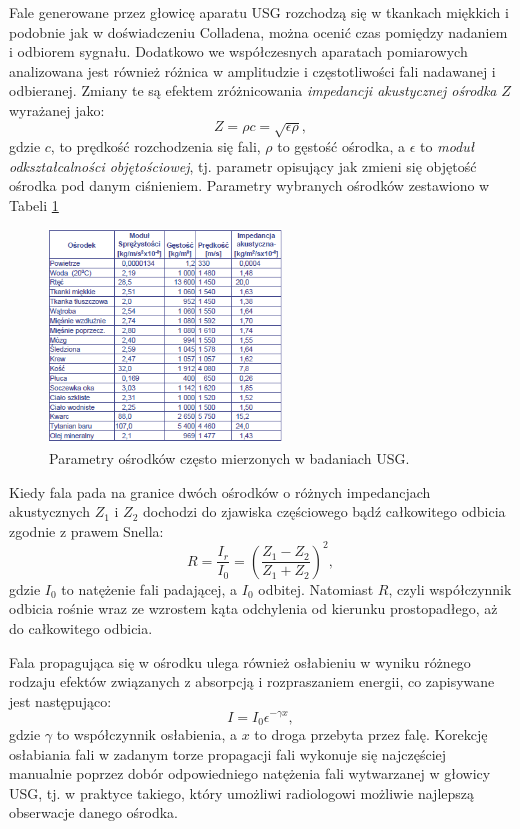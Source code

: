 Fale generowane przez głowicę aparatu USG rozchodzą się w tkankach miękkich i podobnie jak w doświadczeniu Colladena, można ocenić czas pomiędzy nadaniem i odbiorem sygnału. Dodatkowo we współczesnych aparatach pomiarowych analizowana jest również różnica w amplitudzie i częstotliwości fali nadawanej i odbieranej. Zmiany te są efektem zróżnicowania \textit{impedancji akustycznej ośrodka} $Z$ wyrażanej jako:
\begin{equation}
Z = \rho c = \sqrt{\epsilon \rho},
\end{equation}
gdzie $c$, to prędkość rozchodzenia się fali, $\rho$ to gęstość ośrodka, a $\epsilon$ to \textit{moduł odkształcalności objętościowej}, tj. parametr opisujący jak zmieni się objętość ośrodka pod danym ciśnieniem. Parametry wybranych ośrodków zestawiono w Tabeli \ref{USG-params} 
\begin{figure}[h!]
	\centering
	\includegraphics[width=0.55\textwidth]{figures/USG-params.png}
	\caption{Parametry ośrodków często mierzonych w badaniach USG.}
	\label{USG-params}
\end{figure}
Kiedy fala pada na granice dwóch ośrodków o różnych impedancjach akustycznych $Z_1$ i $Z_2$ dochodzi do zjawiska częściowego bądź całkowitego odbicia zgodnie z prawem Snella:
\begin{equation}
R = \frac{I_r}{I_0} = \left(\frac{Z_1-Z_2}{Z_1+Z_2}\right)^2,
\end{equation}
gdzie $I_0$ to natężenie fali padającej, a $I_0$ odbitej. Natomiast $R$, czyli współczynnik odbicia rośnie wraz ze wzrostem kąta odchylenia od kierunku prostopadłego, aż do całkowitego odbicia.

Fala propagująca się w ośrodku ulega również osłabieniu w wyniku różnego rodzaju efektów związanych z absorpcją i rozpraszaniem energii, co zapisywane jest następująco:
\begin{equation}
I=I_0 \epsilon^{-\gamma x},
\end{equation}
gdzie $\gamma$ to współczynnik osłabienia, a $x$ to droga przebyta przez falę. Korekcję osłabiania fali w zadanym torze propagacji fali wykonuje się najczęściej manualnie poprzez dobór odpowiedniego natężenia fali wytwarzanej w głowicy USG, tj. w praktyce takiego, który umożliwi radiologowi możliwie najlepszą obserwacje danego ośrodka. 

